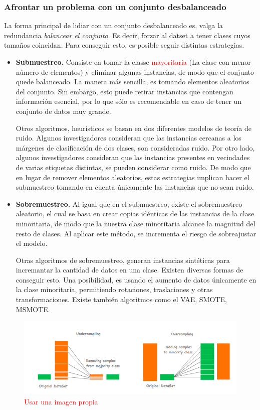     \subsubsection{Afrontar un problema con un conjunto desbalanceado}
    La forma principal de lidiar con un conjunto desbalanceado es, valga la redundancia \textsl{balancear el conjunto}. Es decir, forzar al datset a tener clases cuyos tamaños coincidan. Para conseguir esto, es posible seguir distintas estrategias.
    \begin{itemize}
        \item \textbf{Submuestreo.} Consiste en tomar la classe \textcolor{red}{mayoritaria} (La clase con menor número de elementos) y eliminar algunas instancias, de modo que el conjunto quede balanceado. La manera más sencilla, es tomando elementos aleatorios del conjunto. Sin embargo, esto puede retirar instancias que contengan información esencial, por lo que sólo es recomendable en caso de tener un conjunto de datos muy grande.

        Otros algoritmos, heurísticos se basan en dos diferentes modelos de teoría de ruido. Algunos investigadores consideran que las instancias cercanas a los márgenes de clasificación de dos clases, son consideradas ruido. Por otro lado, algunos investigadores consideran que las instancias presentes en vecindades de varias etiquetas distintas, se pueden considerar como ruido. De modo que en lugar de remover elementos aleatorios, estas estrategias implican hacer el submuestreo tomando en cuenta únicamente las instancias que no sean ruido.

        \item \textbf{Sobremuestreo.} Al igual que en el submuestreo, existe el sobremuestreo aleatorio, el cual se basa en crear copias idénticas de las instancias de la clase minoritaria, de modo que la nuestra clase minoritaria alcance la magnitud del resto de clases. Al aplicar este método, se incrementa el riesgo de sobreajustar el modelo. 

        Otras algoritmos de sobremuestreo, generan instancias sintéticas para incremantar la cantidad de datos en una clase. Existen diversas formas de conseguir esto. Una posibilidad, es usando el aumento de datos únicamente en la clase minoritaria, permitiendo rotaciones, traslaciones y otras transformaciones. Existe también algoritmos como el VAE, SMOTE, MSMOTE. 

    \end{itemize}

    \begin{figure}[H]
        \centering
        \includegraphics[width=6in]{../cap1_preliminares/src/undersampling_oversampling.png}
        \caption{\textcolor{red}{Usar una imagen propia}}
    \end{figure}

